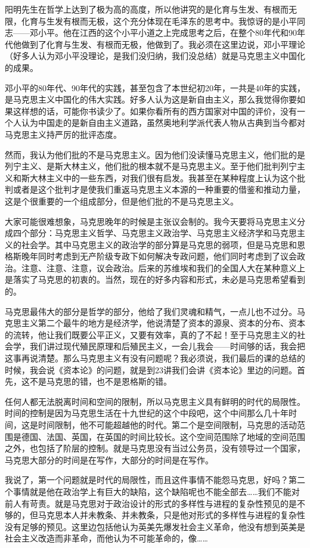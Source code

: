 \documentclass[UTF8, 12pt, a4paper]{ctexrep}
\begin{document}
阳明先生在哲学上达到了极为高的高度，所以他讲究的是化育与生发、有根而无限，化育与生发有根而无极，这个充分体现在毛泽东的思考中。我惊讶的是小平同志——邓小平。他在江西的这个小平小道之上完成思考之后，在整个80年代和90年代他做到了化育与生发、有根而无极，他做到了。我必须在这里边说，邓小平理论（好多人认为邓小平没理论，是我们没归纳，我们没总结）就是马克思主义中国化的成果。

邓小平的80年代、90年代的实践，甚至包含了本世纪初20年，一共是40年的实践，是马克思主义中国化的伟大实践。好多人认为这是新自由主义，那么我觉得你要如果这样想的话，可能你书读少了。如果你看所有的西方国家对中国的评价，没有一个人认为中国走的是新自由主义道路，虽然奥地利学派代表人物从古典到当今都对马克思主义持严厉的批评态度。

然而，我认为他们批的不是马克思主义。因为他们没读懂马克思主义，他们批的是列宁主义、是斯大林主义，他们批的根本就不是马克思主义。至于他们批判列宁主义和斯大林主义中的一些东西，对我们很有启发。我甚至在某种程度上认为这个批判或者是这个批判才是使我们重返马克思主义本源的一种重要的借鉴和推动力量，这是个很重要的一个组成部分，但是他们批的不是马克思主义。

大家可能很难想象，马克思晚年的时候是主张议会制的。我今天要将马克思主义分成四个部分：马克思主义哲学、马克思主义政治学、马克思主义经济学和马克思主义的社会学。其中马克思主义的政治学的部分算是马克思的弱项，但是马克思和恩格斯晚年同时考虑到无产阶级专政下如何解决专政问题，他们同时考虑到了议会政治。注意、注意、注意，议会政治。后来的苏维埃和我们的全国人大在某种意义上是落实了马克思的初衷的。当然，现在的好多内容和形式，未必是马克思希望看到的。

马克思最伟大的部分是哲学的部分，他给了我们灵魂和精气，一点儿也不过分。马克思主义第二个最牛的地方是经济学，他说清楚了资本的源泉、资本的分布、资本的流转，他让我们既要公平正义，又要有效率，真的了不起！至于马克思主义的社会学，我们讲过现代殖民原理和后殖民主义，一会儿我会——时间够的话，我会把这事再说清楚。那么马克思主义有没有问题呢？我必须说，我们最后的课的总结的时候，我会说《资本论》的问题，就是到23讲我们会讲《资本论》里边的问题。首先，这不是马克思的错，也不是恩格斯的错。

任何人都无法脱离时间和空间的限制，所以马克思主义具有鲜明的时代的局限性。时间的控制是因为马克思生活在十九世纪的这个中段吧，这个中间那么几十年时间，这是时间限制，他不可能超越他的时代。第二个是空间限制，马克思的活动范围是德国、法国、英国，在英国的时间比较长。这个空间范围除了地域的空间范围之外，也包括了阶层的控制。就是马克思没有当过公务员，没有领导过一个国家，马克思大部分的时间是在写作，大部分的时间是在写作。

我说了，第一个问题就是时代的局限性，而且这件事情不能怨马克思，好吗？第二个事情就是他在政治学上有巨大的缺陷，这个缺陷呢也不能全部去……我们不能对前人有苛责。就是马克思对于政治设计的形式的多样性与进程的复杂性预见的是不够的，但马克思本人并未教条、并未教条，只是他对形式的多样性与进程的复杂性没有足够的预见。这里边包括他认为英美先爆发社会主义革命，他没有想到英美是社会主义改造而非革命，而他认为不可能革命的，像……
\end{document}

